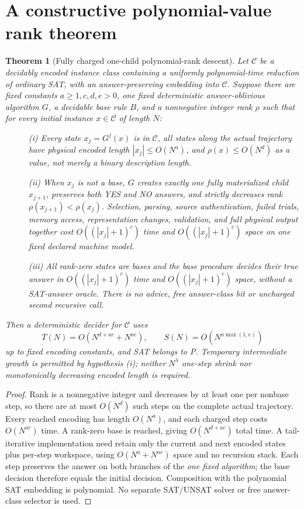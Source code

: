 \documentclass[11pt]{article}
\newtheorem{theorem}{Theorem}
\begin{document}
\section{A constructive polynomial-value rank theorem}
\begin{theorem}[Fully charged one-child polynomial-rank descent]\label{thm:rank}
Let $\mathcal C$ be a decidably encoded instance class containing a uniformly polynomial-time reduction of ordinary SAT, with an answer-preserving embedding into $\mathcal C$. Suppose there are fixed constants $a\ge1,c,d,e>0$, one fixed deterministic answer-oblivious algorithm $G$, a decidable base rule $B$, and a nonnegative integer rank $\rho$ such that for every initial instance $x\in\mathcal C$ of length $N$:
\begin{description}
\item[] (i) Every state $x_j=G^j(x)$ is in $\mathcal C$, all states along the actual trajectory have physical encoded length $|x_j|\le O(N^a)$, and $\rho(x)\le O(N^d)$ as a \emph{value}, not merely a binary description length.
\item[] (ii) When $x_j$ is not a base, $G$ creates exactly one fully materialized child $x_{j+1}$, preserves both YES and NO answers, and strictly decreases rank $\rho(x_{j+1})<\rho(x_j)$. Selection, parsing, source authentication, failed trials, memory access, representation changes, validation, and full physical output together cost $O((|x_j|+1)^c)$ time and $O((|x_j|+1)^e)$ space on one fixed declared machine model.
\item[] (iii) All rank-zero states are bases and the base procedure decides their true answer in $O((|x_j|+1)^c)$ time and $O((|x_j|+1)^e)$ space, without a SAT-answer oracle. There is no advice, free answer-class bit or uncharged second recursive call.
\end{description}
Then a deterministic decider for $\mathcal C$ uses
\[
 \boxed{T(N)=O(N^{d+ac}+N^{ac}),\qquad
 S(N)=O(N^{a\max(1,e)})}
\]
up to fixed encoding constants, and SAT belongs to P. Temporary intermediate \emph{growth} is permitted by hypothesis (i); neither $N^\lambda$ one-step shrink nor monotonically decreasing encoded length is required.
\end{theorem}
\begin{proof}
Rank is a nonnegative integer and decreases by at least one per nonbase step, so there are at most $O(N^d)$ such steps on the complete actual trajectory. Every reached encoding has length $O(N^a)$, and each charged step costs $O(N^{ac})$ time. A rank-zero base is reached, giving $O(N^{d+ac})$ total time. A tail-iterative implementation need retain only the current and next encoded states plus per-step workspace, using $O(N^a+N^{ae})$ space and no recursion stack. Each step preserves the answer on both branches of the \emph{one fixed algorithm}; the base decision therefore equals the initial decision. Composition with the polynomial SAT embedding is polynomial. No separate SAT/UNSAT solver or free answer-class selector is used.
\end{proof}
\end{document}
